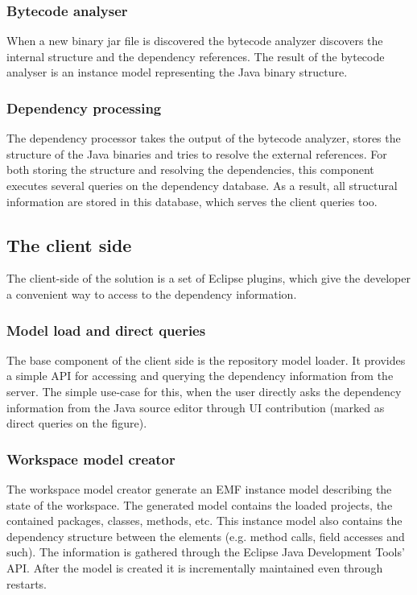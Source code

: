 \subsubsection{Bytecode analyser}
When a new binary jar file is discovered the bytecode analyzer  discovers the
internal structure and the dependency references. The result of the bytecode
analyser is an instance model representing the Java binary structure.

\subsubsection{Dependency processing}
The dependency processor takes the output of the bytecode analyzer, stores the 
structure of the Java binaries and tries to resolve the external references.
For both storing the structure and resolving the dependencies, this component
executes several queries on the dependency database. As a result, all structural
information are stored in this database, which serves the client queries too.


\subsection{The client side}
The client-side of the solution is a set of  Eclipse plugins, which give the
developer a convenient way to access to the dependency information. 

\subsubsection{Model load and direct queries}\label{sect:directqueries}
The base component of the client side is the repository model loader. It
provides a simple API for accessing and querying the dependency information from
the server. The simple use-case for this, when the user directly asks the
dependency information from the Java source editor through UI contribution
(marked as direct queries on the figure).

\subsubsection{Workspace model creator}\label{sect:wsmodelcreator}
The workspace model creator generate an EMF instance model describing the
state of the workspace. The generated model contains the loaded projects, the
contained packages, classes, methods, etc. This instance model also contains the
dependency structure between the elements (e.g. method calls, field accesses and
such). The information is gathered through the Eclipse Java Development Tools'
API. After the model is created it is incrementally maintained even through 
restarts.

